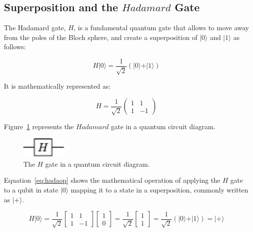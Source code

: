 \subsection{Superposition and the $Hadamard$ Gate}
\label{sec:hada}

The Hadamard gate, $H$, is a fundamental quantum gate that allows to move away 
from the poles of the Bloch sphere, and create a superposition of $\vert 0 \rangle$ 
and $\vert 1 \rangle$ as follows:

\begin{linenomath}
\begin{equation}
H \vert 0 \rangle = \frac{1}{\sqrt{2}}(\vert 0 \rangle + \vert 1 \rangle)
\label{eq:hadamap}
\end{equation}
\end{linenomath}

It is mathematically represented as:

\begin{linenomath}
\begin{equation}
H = \frac{1}{\sqrt{2}} \begin{pmatrix}
1 & 1 \\
1 & -1
\end{pmatrix}
\label{eq:hada}
\end{equation}
\end{linenomath}

Figure~\ref{fig:hada} represents the $Hadamard$ gate in a quantum circuit diagram.

\begin{figure}[!htbp]
\centering
	\includegraphics[width=0.20\textwidth]{figures/H.pdf}
\caption{The $H$ gate in a quantum circuit diagram.}
\label{fig:hada}
\end{figure}

Equation~\ref{eq:hadaop} shows the mathematical operation of applying the $H$
gate to a qubit in state $\vert 0 \rangle$ mapping it to a state in a superposition,
commonly written as $\vert + \rangle$.

\begin{linenomath}
\begin{equation}
H\vert 0 \rangle=\frac{1}{\sqrt{2}}\begin{bmatrix} 1 & 1 \\ 1 & -1 \end{bmatrix} \begin{bmatrix} 1 \\ 0 \end{bmatrix} = \frac{1}{\sqrt{2}}\begin{bmatrix} 1 \\ 1 \end{bmatrix} = \frac{1}{\sqrt{2}} (\vert 0 \rangle + \vert 1 \rangle) = \vert + \rangle
\label{eq:hadaop}
\end{equation}
\end{linenomath}

